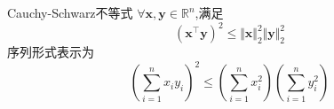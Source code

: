 \begin{theorem}{Cauchy-Schwarz不等式}
$\forall \boldsymbol{x},\boldsymbol{y}\in\mathbb{R}^n$,满足
\begin{equation}
(\boldsymbol{x}^{\top}\boldsymbol{y})^2\leqslant \Vert \boldsymbol{x}\Vert_2^2\Vert \boldsymbol{y}\Vert_2^2~
\end{equation}
序列形式表示为
\begin{equation}
\left(\sum_{i=1}^{n}x_iy_i\right)^2\leqslant \left(\sum_{i=1}^nx_i^2\right)\left(\sum_{i=1}^ny_i^2\right)~
\end{equation}
\end{theorem}